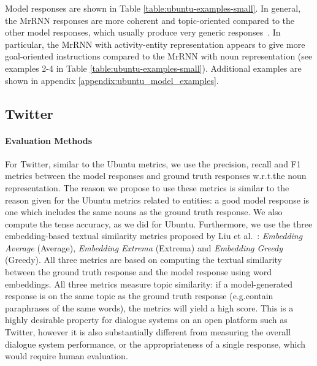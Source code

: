 \documentclass{article}
\begin{document}
Model responses are shown in Table \ref{table:ubuntu-examples-small}.
In general, the MrRNN responses are more coherent and topic-oriented compared to the other model responses, which usually produce very generic responses~\cite{DBLP:conf/aaai/SerbanSBCP16}.
In particular, the MrRNN with activity-entity representation appears to give more goal-oriented instructions compared to the MrRNN with noun representation (see examples 2-4 in Table \ref{table:ubuntu-examples-small}).
Additional examples are shown in appendix \ref{appendix:ubuntu_model_examples}.

\subsection{Twitter}

\paragraph{Evaluation Methods} 
For Twitter, similar to the Ubuntu metrics, we use the precision, recall and F1 metrics between the model responses and ground truth responses w.r.t.\@ the noun representation.
The reason we propose to use these metrics is similar to the reason given for the Ubuntu metrics related to entities: a good model response is one which includes the same nouns as the ground truth response.
We also compute the tense accuracy, as we did for Ubuntu.
Furthermore, we use the three embedding-based textual similarity metrics proposed by Liu et al.~\cite{liu2016not}:
\textit{Embedding Average} (Average), \textit{Embedding Extrema} (Extrema) and  \textit{Embedding Greedy} (Greedy).
All three metrics are based on computing the textual similarity between the ground truth response and the model response using word embeddings.
All three metrics measure topic similarity: if a model-generated response is on the same topic as the ground truth response (e.g.\@ contain paraphrases of the same words), the metrics will yield a high score.
This is a highly desirable property for dialogue systems on an open platform such as Twitter, however it is also substantially different from measuring the overall dialogue system performance, or the appropriateness of a single response, which would require human evaluation.
\end{document}
